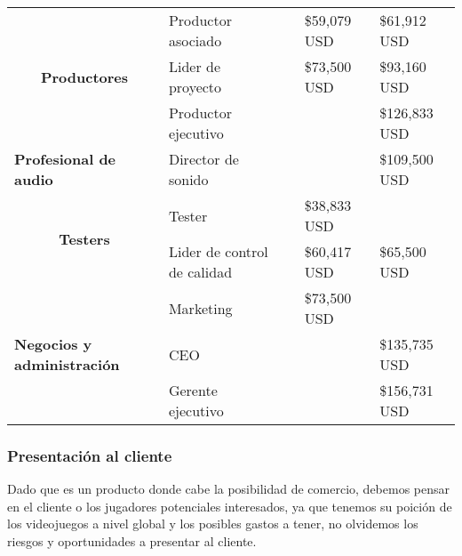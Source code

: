 \begin{table}[htbp]
{\begin{tabular}{|l|l|l|l|l|}
		\multicolumn{1}{|c|}{\multirow{3}{*}{\textbf{Productores}}}          & Productor asociado          &                                     & \$59,079 USD                         & \$61,912 USD                        \\ \cline{2-5} 
		\multicolumn{1}{|c|}{}                                               & Lider de proyecto           &                                     & \$73,500 USD                         & \$93,160 USD                        \\ \cline{2-5} 
		\multicolumn{1}{|c|}{}                                               & Productor ejecutivo         &                                     &                                      & \$126,833 USD                       \\ \hline
		\textbf{Profesional de audio}                                        & Director de sonido          &                                     &                                      & \$109,500 USD                       \\ \hline
		\multicolumn{1}{|c|}{\multirow{2}{*}{\textbf{Testers}}}              & Tester                      &                                     & \$38,833 USD                         &                                     \\ \cline{2-5} 
		\multicolumn{1}{|c|}{}                                               & Lider de control de calidad &                                     & \$60,417 USD                         & \$65,500 USD                        \\ \hline
		\multirow{3}{*}{\textbf{Negocios y administración}}                  & Marketing                   &                                     & \$73,500 USD                         &                                     \\ \cline{2-5} 
		& CEO                         &                                     &                                      & \$135,735 USD                       \\ \cline{2-5} 
		& Gerente ejecutivo           &                                     &                                      & \$156,731 USD                       \\ \hline
	\end{tabular}
}
\end{table}

\subsubsection{Presentación al cliente}
Dado que es un producto donde cabe la posibilidad de comercio, debemos pensar en el cliente o los jugadores potenciales interesados, ya que tenemos su poición de los videojuegos a nivel global y los posibles gastos a tener, no olvidemos los riesgos y oportunidades a presentar al cliente.

